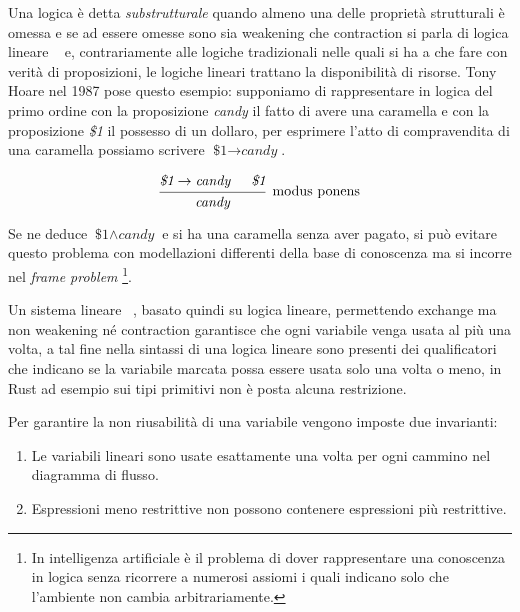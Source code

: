 \documentclass[Lau,binding=0.6cm]{sapthesis}
\begin{document}
Una logica è detta \textit{substrutturale} quando almeno una delle proprietà strutturali è omessa e se ad essere omesse sono sia weakening che contraction si parla di logica lineare ~\cite{girard:linear_logic} e, contrariamente alle logiche tradizionali nelle quali si ha a che fare con verità di proposizioni, le logiche lineari trattano la disponibilità di risorse. 
Tony Hoare nel 1987 pose questo esempio: supponiamo di rappresentare in logica del primo ordine con la proposizione \textit{candy} il fatto di avere una caramella e con la proposizione \textit{\$1} il possesso di un dollaro, per esprimere l'atto di compravendita di una caramella possiamo scrivere $ \textit{\$1} \rightarrow \textit{candy} $.

\begin{equation*}
  \begin{prooftree}
    \hypo{\textit{\$1} \rightarrow \textit{candy}}
    \hypo{\textit{\$1}}
    \infer2[modus ponens]{\textit{candy}}
  \end{prooftree}
\end{equation*}

Se ne deduce $ \textit{\$1} \land \textit{candy} $ e si ha una caramella senza aver pagato, si può evitare questo problema con modellazioni differenti della base di conoscenza ma si incorre nel \textit{frame problem} \footnote{In intelligenza artificiale è il problema di dover rappresentare una conoscenza in logica senza ricorrere a numerosi assiomi i quali indicano solo che l'ambiente non cambia arbitrariamente.}. 

Un sistema lineare ~\cite{walker:linear_logic}, basato quindi su logica lineare, permettendo exchange ma non weakening né contraction garantisce che ogni variabile venga usata al più una volta, a tal fine nella sintassi di una logica lineare sono presenti dei qualificatori che indicano se la variabile marcata possa essere usata solo una volta o meno, in Rust ad esempio sui tipi primitivi non è posta alcuna restrizione. 

Per garantire la non riusabilità di una variabile vengono imposte due invarianti:

\begin{enumerate}
    \item Le variabili lineari sono usate esattamente una volta per ogni cammino nel diagramma di flusso.
    \item Espressioni meno restrittive non possono contenere espressioni più restrittive. 
\end{enumerate}
\end{document}
